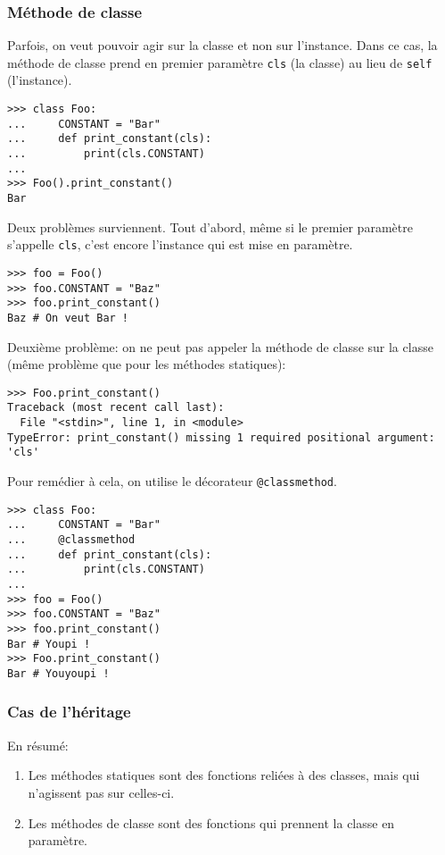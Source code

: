 \subsubsection{Méthode de classe}
\label{sec:classmethod}

Parfois, on veut pouvoir agir sur la classe et non sur l'instance. Dans ce cas, la méthode de classe prend en premier paramètre \texttt{cls} (la classe) au lieu de \texttt{self} (l'instance).

\begin{verbatim}
>>> class Foo:
...     CONSTANT = "Bar"
...     def print_constant(cls):
...         print(cls.CONSTANT)
...
>>> Foo().print_constant()
Bar
\end{verbatim}

Deux problèmes surviennent. Tout d'abord, même si le premier paramètre s'appelle \texttt{cls}, c'est encore l'instance qui est mise en paramètre.

\begin{verbatim}
>>> foo = Foo()
>>> foo.CONSTANT = "Baz"
>>> foo.print_constant()
Baz # On veut Bar !
\end{verbatim}

Deuxième problème: on ne peut pas appeler la méthode de classe sur la classe (même problème que pour les méthodes statiques):

\begin{verbatim}
>>> Foo.print_constant()
Traceback (most recent call last):
  File "<stdin>", line 1, in <module>
TypeError: print_constant() missing 1 required positional argument: 'cls'
\end{verbatim}

Pour remédier à cela, on utilise le décorateur \texttt{@classmethod}.

\begin{verbatim}
>>> class Foo:
...     CONSTANT = "Bar"
...     @classmethod
...     def print_constant(cls):
...         print(cls.CONSTANT)
...
>>> foo = Foo()
>>> foo.CONSTANT = "Baz"
>>> foo.print_constant()
Bar # Youpi !
>>> Foo.print_constant()
Bar # Youyoupi !
\end{verbatim}

\subsubsection{Cas de l'héritage}
En résumé:
\begin{enumerate}
	\item Les méthodes statiques sont des fonctions reliées à des classes, mais qui n'agissent pas sur celles-ci.
	\item Les méthodes de classe sont des fonctions qui prennent la classe en paramètre.
\end{enumerate}

